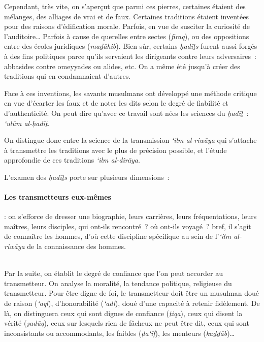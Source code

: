 Cependant, très vite, on s'aperçut que parmi ces pierres, certaines
étaient des mélanges, des alliages de vrai et de faux. Certaines
traditions étaient inventées pour des raisons d'édification morale.
Parfois, en vue de susciter la curiosité de l'auditoire\ldots{} Parfois
à cause de querelles entre sectes (\emph{firaq}), ou des oppositions
entre des écoles juridiques (\emph{maḏāhib}). Bien sûr, certains
\emph{ḥadīṯs} furent aussi forgés à des fins politiques parce qu'ils
servaient les dirigeants contre leurs adversaires~: abbasides contre
omeyyades ou alides, etc. On a même été jusqu'à créer des traditions qui
en condamnaient d'autres.

Face à ces inventions, les savants musulmans ont développé une méthode
critique en vue d'écarter les faux et de noter les dits selon le degré
de fiabilité et d'authenticité. On peut dire qu'avec ce travail sont
nées les sciences du \emph{ḥadīṯ}~: \emph{`ulūm al-ḥadīṯ.}

On distingue donc entre la science de la transmission \emph{`ilm
al-riwāya} qui s'attache à transmettre les traditions avec le plus de
précision possible, et l'étude approfondie de ces traditions \emph{`ilm
al-dirāya}.

L'examen des \emph{ḥadīṯs} porte sur plusieurs dimensions~:

 
 \paragraph{Les transmetteurs eux-mêmes~} : on s'efforce de dresser une biographie,
  leurs carrières, leurs fréquentations, leurs maîtres, leurs disciples,
  qui ont-ils rencontré~? où ont-ils voyagé~? bref, il s'agit de
  connaître les hommes, d'où cette discipline spécifique au sein de
  l'\emph{`ilm al-riwāya} de la connaissance des hommes.
 
\\
 
Par la suite, on établit le degré de confiance que l'on peut accorder au
transmetteur. On analyse la moralité, la tendance politique, religieuse
du transmetteur. Pour être digne de foi, le transmetteur doit être un
musulman doué de raison (\emph{`aql}), d'honorabilité (\emph{`adl}),
doué d'une capacité à retenir fidèlement. De là, on distinguera ceux qui
sont dignes de confiance (\emph{ṯiqa}), ceux qui disent la vérité
(\emph{ṣadūq}), ceux sur lesquels rien de fâcheux ne peut être dit, ceux
qui sont inconsistants ou accommodants, les faibles (\emph{ḍa`īf}), les
menteurs (\emph{kaḏḏāb})\ldots{}
 

